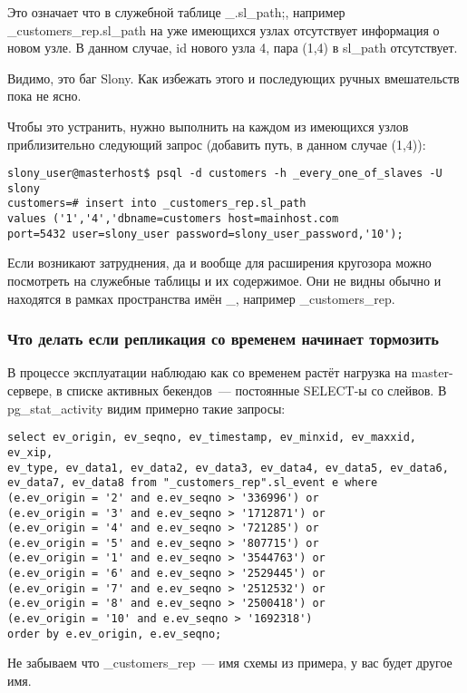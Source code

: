 Это означает что в служебной таблице \_<имя кластера>.sl\_path;, например 
\_customers\_rep.sl\_path на уже имеющихся узлах отсутствует информация о новом узле. В данном случае, 
id нового узла 4, пара (1,4) в sl\_path отсутствует.

Видимо, это баг Slony. Как избежать этого и последующих ручных вмешательств пока не ясно.

Чтобы это устранить, нужно выполнить на каждом из имеющихся узлов приблизительно следующий запрос 
(добавить путь, в данном случае (1,4)):
\begin{lstlisting}[label=lst:slony18,caption=Устранение неисправностей]
slony_user@masterhost$ psql -d customers -h _every_one_of_slaves -U slony
customers=# insert into _customers_rep.sl_path 
values ('1','4','dbname=customers host=mainhost.com 
port=5432 user=slony_user password=slony_user_password,'10');
\end{lstlisting}

Если возникают затруднения, да и вообще для расширения кругозора можно посмотреть на служебные таблицы 
и их содержимое. Они не видны обычно и находятся в рамках пространства имён \_<имя кластера>, 
например \_customers\_rep. 

\subsubsection{Что делать если репликация со временем начинает тормозить}
В процессе эксплуатации наблюдаю как со временем растёт нагрузка на master-сервере, в списке активных бекендов~--- 
постоянные SELECT-ы со слейвов. В pg\_stat\_activity видим примерно такие запросы:
\begin{lstlisting}[label=lst:slony19,caption=Устранение неисправностей]
select ev_origin, ev_seqno, ev_timestamp, ev_minxid, ev_maxxid, ev_xip, 
ev_type, ev_data1, ev_data2, ev_data3, ev_data4, ev_data5, ev_data6, 
ev_data7, ev_data8 from "_customers_rep".sl_event e where 
(e.ev_origin = '2' and e.ev_seqno > '336996') or 
(e.ev_origin = '3' and e.ev_seqno > '1712871') or 
(e.ev_origin = '4' and e.ev_seqno > '721285') or 
(e.ev_origin = '5' and e.ev_seqno > '807715') or 
(e.ev_origin = '1' and e.ev_seqno > '3544763') or 
(e.ev_origin = '6' and e.ev_seqno > '2529445') or 
(e.ev_origin = '7' and e.ev_seqno > '2512532') or 
(e.ev_origin = '8' and e.ev_seqno > '2500418') or 
(e.ev_origin = '10' and e.ev_seqno > '1692318') 
order by e.ev_origin, e.ev_seqno;
\end{lstlisting}

Не забываем что \_customers\_rep~--- имя схемы из примера, у вас будет другое имя.

